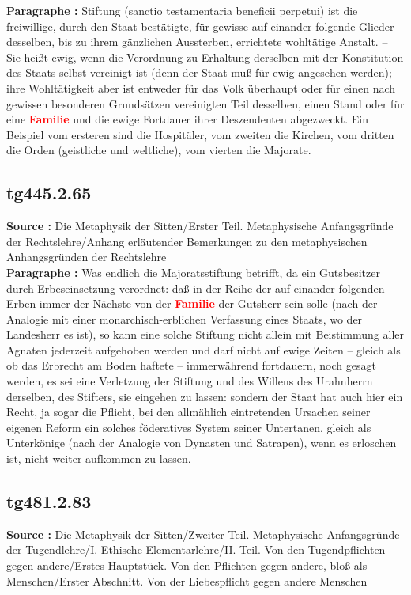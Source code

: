 \documentclass[a4paper,12pt,twoside]{book}
\newcommand{\match}[1]{\textcolor{red}{\textbf{#1}}}
\begin{document}
	\textbf{Paragraphe : }
	Stiftung (sanctio testamentaria beneficii perpetui) ist die freiwillige, durch den Staat bestätigte, für gewisse auf einander folgende Glieder desselben, bis zu ihrem gänzlichen Aussterben, errichtete wohltätige Anstalt. – Sie heißt ewig, wenn die Verordnung zu Erhaltung derselben mit der Konstitution des Staats selbst vereinigt ist (denn der Staat muß für ewig angesehen werden); ihre Wohltätigkeit aber ist entweder für das Volk überhaupt oder für einen nach gewissen besonderen Grundsätzen vereinigten Teil desselben, einen Stand oder für eine \match{Familie} und die ewige Fortdauer ihrer Deszendenten abgezweckt. Ein Beispiel vom ersteren sind die Hospitäler, vom zweiten die Kirchen, vom dritten die Orden (geistliche und weltliche), vom vierten die Majorate. 
	
	\subsection*{tg445.2.65} 
	\textbf{Source : }Die Metaphysik der Sitten/Erster Teil. Metaphysische Anfangsgründe der Rechtslehre/Anhang erläutender Bemerkungen zu den metaphysischen Anhangsgründen der Rechtslehre\\  
	
	\textbf{Paragraphe : }Was endlich die Majoratsstiftung betrifft, da ein Gutsbesitzer durch Erbeseinsetzung verordnet: daß in der Reihe der auf einander folgenden Erben immer der Nächste von der \match{Familie} der Gutsherr sein solle (nach der Analogie mit einer monarchisch-erblichen Verfassung eines Staats, wo der Landesherr es ist), so kann eine solche Stiftung nicht allein mit Beistimmung aller Agnaten jederzeit aufgehoben werden und darf nicht auf ewige Zeiten – gleich als ob das Erbrecht am Boden haftete – immerwährend fortdauern, noch gesagt werden, es sei eine Verletzung der Stiftung und des Willens des Urahnherrn derselben, des Stifters, sie eingehen zu lassen: sondern der Staat hat auch hier ein Recht, ja sogar die Pflicht, bei den allmählich eintretenden Ursachen seiner eigenen Reform ein solches föderatives System seiner Untertanen, gleich als Unterkönige (nach der Analogie von Dynasten und Satrapen), wenn es erloschen ist, nicht weiter aufkommen zu lassen. 
	
	\subsection*{tg481.2.83} 
	\textbf{Source : }Die Metaphysik der Sitten/Zweiter Teil. Metaphysische Anfangsgründe der Tugendlehre/I. Ethische Elementarlehre/II. Teil. Von den Tugendpflichten gegen andere/Erstes Hauptstück. Von den Pflichten gegen andere, bloß als Menschen/Erster Abschnitt. Von der Liebespflicht gegen andere Menschen\\  
	
\end{document}
